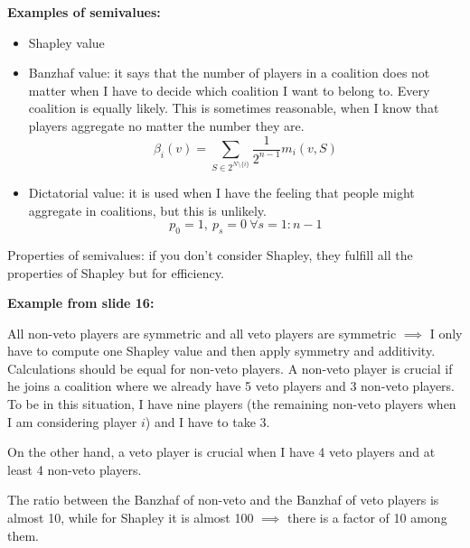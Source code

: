\bigskip
\noindent \textbf{Examples of semivalues:}
\begin{itemize}
	
	\item Shapley value
	
	\item Banzhaf value: it says that the number of players in a coalition 
	does not matter when I have to decide which coalition I want to belong to. 
	Every coalition is equally likely. This is sometimes reasonable, when I 
	know that players aggregate no matter the number they are.
	\[
		\beta_i(v) = \sum_{S \in 2^{N \setminus \{i\}}}
		{\frac{1}{2^{n-1}}m_i(v,S)}
	\]

	\item Dictatorial value: it is used when I have the feeling that people might 
	aggregate in coalitions, but this is unlikely.
	\[
		p_0 = 1, ~p_s = 0 ~\forall s=1:n-1
	\]
\end{itemize}

\bigskip
\noindent Properties of semivalues: if you don't consider Shapley, they fulfill 
all the properties of Shapley but for efficiency.

\bigskip
\noindent \textbf{Example from slide 16:}

\noindent All non-veto players are symmetric and all veto players are 
symmetric $\implies$ I only have to compute one Shapley value and then 
apply symmetry and additivity. Calculations should be equal for non-veto 
players. A non-veto player is crucial if he joins a coalition where we already 
have 5 veto players and 3 non-veto players. To be in this situation, I have 
nine players (the remaining non-veto players when I am considering player 
$i$) and I have to take 3.

\noindent On the other hand, a veto player is crucial when I have 4 veto 
players and at least 4 non-veto players.

\noindent The ratio between the Banzhaf of non-veto and the Banzhaf of 
veto players is almost 10, while for Shapley it is almost 100 $\implies$ 
there is a factor of 10 among them.

%
